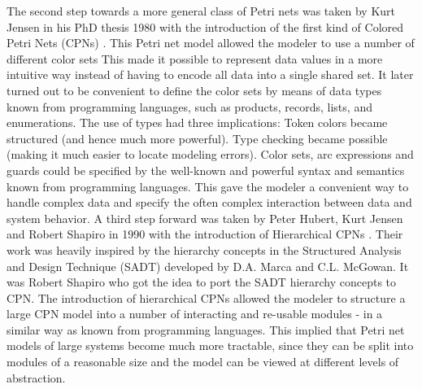 The second step towards a more general class of Petri nets was taken
by Kurt Jensen in his PhD thesis 1980 with the introduction of the
first kind of Colored Petri Nets (CPNs) \cite{jensen:81}. This Petri
net model allowed the modeler to use a number of different color sets
This made it possible to represent data values in a more intuitive way
instead of having to encode all data into a single shared set. It
later turned out to be convenient to define the color sets by means of
data types known from programming languages, such as products,
records, lists, and enumerations. The use of types had three
implications: Token colors became structured (and hence much more
powerful). Type checking became possible (making it much easier to
locate modeling errors). Color sets, arc expressions and guards could
be specified by the well-known and powerful syntax and semantics known
from programming languages. This gave the modeler a convenient way to
handle complex data and specify the often complex interaction between
data and system behavior. A third step forward was taken by Peter
Hubert, Kurt Jensen and Robert Shapiro in 1990 with the introduction
of Hierarchical CPNs \cite{huber:91}. Their work was heavily inspired
by the hierarchy concepts in the Structured Analysis and Design
Technique (SADT) \cite{X} developed by D.A. Marca and C.L. McGowan. It
was Robert Shapiro who got the idea to port the SADT hierarchy
concepts to CPN.  The introduction of hierarchical CPNs allowed the
modeler to structure a large CPN model into a number of interacting
and re-usable modules - in a similar way as known from programming
languages. This implied that Petri net models of large systems become
much more tractable, since they can be split into modules of a
reasonable size and the model can be viewed at different levels of
abstraction.



